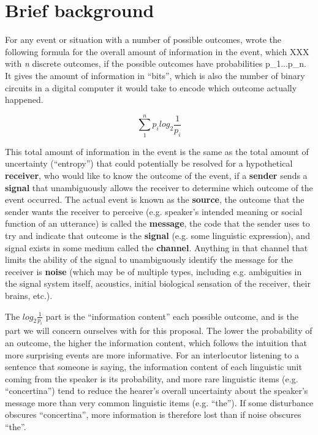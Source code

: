 \documentclass[12pt]{article}
\begin{document}
\section{Brief background}

For any event or situation with a number of possible outcomes, \citet{shannon1948} wrote the following formula for the overall amount of information in the event, which XXX with \textsl{n} discrete outcomes, if the possible outcomes have probabilities p_1...p_n. It gives the amount of information in ``bits'', which is also the number of binary circuits in a digital computer it would take to encode which outcome actually happened.

\begin{center}
	$$\sum_{1}^{n} p_i log_2 \frac{1}{p_i}$$
\end{center}

This total amount of information in the event is the same as the total amount of uncertainty (``entropy'') that could potentially be resolved for a hypothetical \textbf{receiver}, who would like to know the outcome of the event, if a \textbf{sender} sends a \textbf{signal} that unambiguously allows the receiver to determine which outcome of the event occurred. The actual event is known as the \textbf{source}, the outcome that the sender wants the receiver to perceive (e.g. speaker's intended meaning or social function of an utterance) is called the \textbf{message}, the code that the sender uses to try and indicate that outcome is the \textbf{signal} (e.g. some linguistic expression), and signal exists in some medium called the \textbf{channel}. Anything in that channel that limits the ability of the signal to unambiguously identify the message for the receiver is \textbf{noise} (which may be of multiple types, including e.g. ambiguities in the signal system itself, acoustics, initial biological sensation of the receiver, their brains, etc.).

\noindent The $log_2 \frac{1}{p_i}$ part is the ``information content'' each possible outcome, and is the part we will concern ourselves with for this proposal. The lower the probability of an outcome, the higher the information content, which follows the intuition that more surprising events are more informative. For an interlocutor listening to a sentence that someone is saying, the information content of each linguistic unit coming from the speaker is its probability, and more rare linguistic items (e.g. ``concertina'') tend to reduce the hearer's overall uncertainty about the speaker's message more than very common linguistic items (e.g. ``the''). If some disturbance obscures ``concertina'', more information is therefore lost than if noise obscures ``the''.
\end{document}
